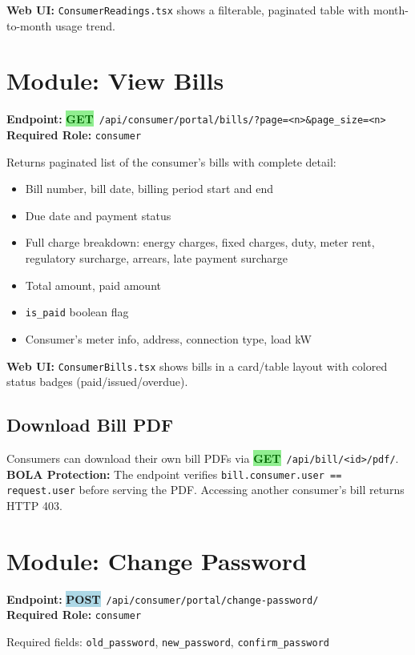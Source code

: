 \documentclass[12pt, a4paper]{report}
\newcommand{\httpget}{\colorbox{lightGreen}{\textcolor{darkGreen}{\textbf{\small GET}}}}
\newcommand{\httppost}{\colorbox{lightBlue}{\textcolor{deepBlue}{\textbf{\small POST}}}}
\newenvironment{featurelist}{%
    \begin{itemize}[leftmargin=1.5em, itemsep=2pt, parsep=0pt]
}{%
    \end{itemize}
}
\begin{document}
\textbf{Web UI:} \texttt{ConsumerReadings.tsx} shows a filterable, paginated table with month-to-month usage trend.

\section{Module: View Bills}

\textbf{Endpoint:} \httpget\ \texttt{/api/consumer/portal/bills/?page=<n>\&page\_size=<n>}\\
\textbf{Required Role:} \texttt{consumer}

Returns paginated list of the consumer's bills with complete detail:
\begin{featurelist}
    \item Bill number, bill date, billing period start and end
    \item Due date and payment status
    \item Full charge breakdown: energy charges, fixed charges, duty, meter rent, regulatory surcharge, arrears, late payment surcharge
    \item Total amount, paid amount
    \item \texttt{is\_paid} boolean flag
    \item Consumer's meter info, address, connection type, load kW
\end{featurelist}

\textbf{Web UI:} \texttt{ConsumerBills.tsx} shows bills in a card/table layout with colored status badges (paid/issued/overdue).

\subsection{Download Bill PDF}
Consumers can download their own bill PDFs via \httpget\ \texttt{/api/bill/<id>/pdf/}.\\
\textbf{BOLA Protection:} The endpoint verifies \texttt{bill.consumer.user == request.user} before serving the PDF. Accessing another consumer's bill returns HTTP 403.

\section{Module: Change Password}

\textbf{Endpoint:} \httppost\ \texttt{/api/consumer/portal/change-password/}\\
\textbf{Required Role:} \texttt{consumer}

Required fields: \texttt{old\_password}, \texttt{new\_password}, \texttt{confirm\_password}
\end{document}
